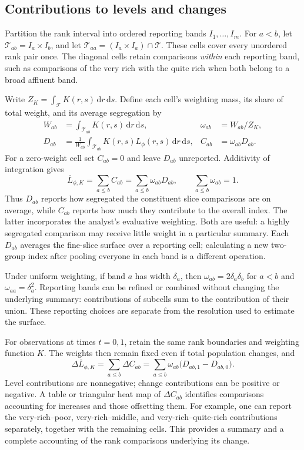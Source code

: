 \documentclass[11pt]{article}
\newcommand{\dd}{\,\mathrm{d}}
\newcommand{\T}{\mathcal{T}}
\begin{document}
\subsection{Contributions to levels and changes}
\label{sec:decomposition}

Partition the rank interval into ordered reporting bands $I_1,\ldots,I_m$. For $a<b$, let $\T_{ab}=I_a\times I_b$, and let $\T_{aa}=(I_a\times I_a)\cap\T$. These cells cover every unordered rank pair once. The diagonal cells retain comparisons \emph{within} each reporting band, such as comparisons of the very rich with the quite rich when both belong to a broad affluent band.

Write $Z_K=\int_\T K(r,s)\dd r\dd s$. Define each cell's weighting mass, its share of total weight, and its average segregation by
\begin{align}
W_{ab}&=\int_{\T_{ab}}K(r,s)\dd r\dd s,
&\omega_{ab}&=W_{ab}/Z_K,\nonumber\\
D_{ab}&=\frac{1}{W_{ab}}\int_{\T_{ab}}K(r,s)L_\phi(r,s)\dd r\dd s,
&C_{ab}&=\omega_{ab}D_{ab}.
\label{eq:cell-contributions}
\end{align}
For a zero-weight cell set $C_{ab}=0$ and leave $D_{ab}$ unreported. Additivity of integration gives
\begin{equation}
\overline L_{\phi,K}=\sum_{a\leq b}C_{ab}
=\sum_{a\leq b}\omega_{ab}D_{ab},\qquad
\sum_{a\leq b}\omega_{ab}=1.
\label{eq:level-decomposition}
\end{equation}
Thus $D_{ab}$ reports how segregated the constituent slice comparisons are on average, while $C_{ab}$ reports how much they contribute to the overall index. The latter incorporates the analyst's evaluative weighting. Both are useful: a highly segregated comparison may receive little weight in a particular summary. Each $D_{ab}$ averages the fine-slice surface over a reporting cell; calculating a new two-group index after pooling everyone in each band is a different operation.

Under uniform weighting, if band $a$ has width $\delta_a$, then $\omega_{ab}=2\delta_a\delta_b$ for $a<b$ and $\omega_{aa}=\delta_a^2$. Reporting bands can be refined or combined without changing the underlying summary: contributions of subcells sum to the contribution of their union. These reporting choices are separate from the resolution used to estimate the surface.

For observations at times $t=0,1$, retain the same rank boundaries and weighting function $K$. The weights then remain fixed even if total population changes, and
\begin{equation}
\Delta\overline L_{\phi,K}
=\sum_{a\leq b}\Delta C_{ab}
=\sum_{a\leq b}\omega_{ab}\bigl(D_{ab,1}-D_{ab,0}\bigr).
\label{eq:change-decomposition}
\end{equation}
Level contributions are nonnegative; change contributions can be positive or negative. A table or triangular heat map of $\Delta C_{ab}$ identifies comparisons accounting for increases and those offsetting them. For example, one can report the very-rich--poor, very-rich--middle, and very-rich--quite-rich contributions separately, together with the remaining cells. This provides a summary and a complete accounting of the rank comparisons underlying its change.
\end{document}
